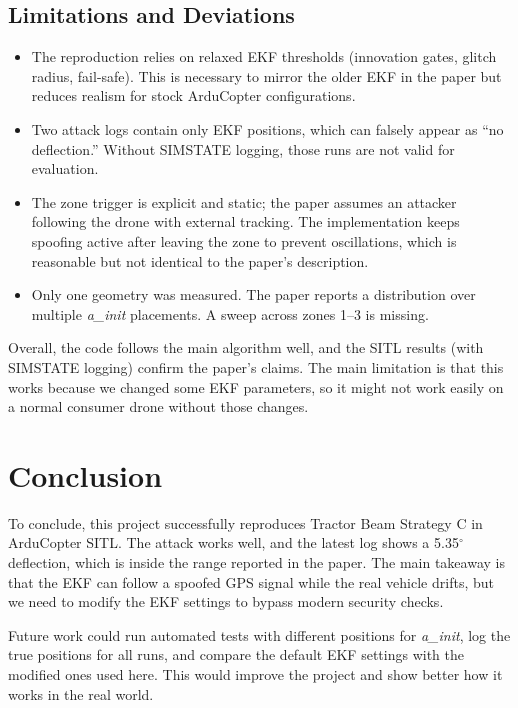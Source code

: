 \documentclass[12pt, a4paper]{article}
\begin{document}
\subsection{Limitations and Deviations}
\begin{itemize}[noitemsep]
  \item The reproduction relies on relaxed EKF thresholds (innovation gates, glitch radius, fail-safe). This is necessary to mirror the older EKF in the paper but reduces realism for stock ArduCopter configurations.
  \item Two attack logs contain only EKF positions, which can falsely appear as ``no deflection.'' Without SIMSTATE logging, those runs are not valid for evaluation.
  \item The zone trigger is explicit and static; the paper assumes an attacker following the drone with external tracking. The implementation keeps spoofing active after leaving the zone to prevent oscillations, which is reasonable but not identical to the paper's description.
  \item Only one geometry was measured. The paper reports a distribution over multiple \textit{a\_init} placements. A sweep across zones 1--3 is missing.
\end{itemize}

Overall, the code follows the main algorithm well, and the SITL results (with SIMSTATE logging) confirm the paper's claims. The main limitation is that this works because we changed some EKF parameters, so it might not work easily on a normal consumer drone without those changes.

\section{Conclusion}

To conclude, this project successfully reproduces Tractor Beam Strategy C in ArduCopter SITL. The attack works well, and the latest log shows a 5.35$^\circ$ deflection, which is inside the range reported in the paper. The main takeaway is that the EKF can follow a spoofed GPS signal while the real vehicle drifts, but we need to modify the EKF settings to bypass modern security checks.

Future work could run automated tests with different positions for \textit{a\_init}, log the true positions for all runs, and compare the default EKF settings with the modified ones used here. This would improve the project and show better how it works in the real world.

\end{document}
